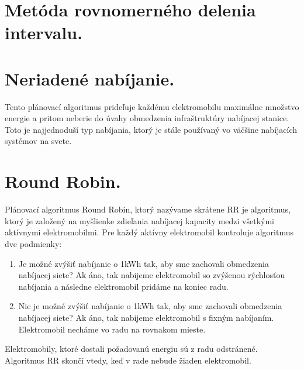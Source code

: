 



\section{Metóda rovnomerného delenia intervalu.}







\section{Neriadené nabíjanie.}
Tento plánovací algoritmus prideľuje každému elektromobilu maximálne množstvo energie a pritom neberie do úvahy obmedzenia infraštruktúry nabíjacej stanice. Toto je najjednoduší typ nabíjania, ktorý je stále používaný vo väčšine nabíjacích systémov na svete. \cite{lee2021acnsim}

\section{Round Robin.}
Plánovací algoritmus Round Robin, ktorý nazývame skrátene RR je algoritmus, ktorý je založený na myšlienke zdieľania nabíjacej kapacity medzi všetkými aktívnymi elektromobilmi. Pre každý aktívny elektromobil kontroluje algoritmus dve podmienky:
\begin{enumerate}
    \item Je možné zvýšiť nabíjanie o 1kWh tak, aby sme zachovali obmedzenia nabíjacej siete? Ak áno, tak nabijeme elektromobil so zvýšenou rýchlosťou nabíjania a následne elektromobil pridáme na koniec radu.
    \item Nie je možné zvýšiť nabíjanie o 1kWh tak, aby sme zachovali obmedzenia nabíjacej siete? Ak áno, tak nabijeme elektromobil s fixným nabíjaním. Elektromobil necháme vo radu na rovnakom mieste.
\end{enumerate}
Elektromobily, ktoré dostali požadovanú energiu sú z radu odstránené. Algoritmus RR skončí vtedy, keď v rade nebude žiaden elektromobil. \cite{lee2021acnsim}

